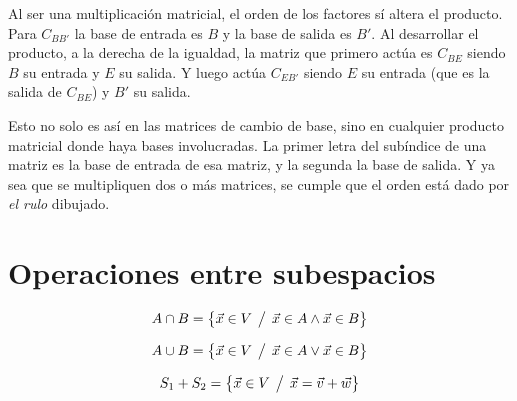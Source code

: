 Al ser una multiplicación matricial, el orden de los factores sí altera el producto.
Para $C_{BB'}$ la base de entrada es $B$ y la base de salida es $B'$.
Al desarrollar el producto, a la derecha de la igualdad, la matriz que primero actúa es $C_{BE}$ siendo $B$ su entrada y $E$ su salida.
Y luego actúa $C_{EB'}$ siendo $E$ su entrada (que es la salida de $C_{BE}$) y $B'$ su salida.

\begin{center}
    \def\svgwidth{0.4\linewidth}
    
\end{center}

Esto no solo es así en las matrices de cambio de base, sino en cualquier producto matricial donde haya bases involucradas.
La primer letra del subíndice de una matriz es la base de entrada de esa matriz, y la segunda la base de salida.
Y ya sea que se multipliquen dos o más matrices, se cumple que el orden está dado por \emph{el rulo} dibujado.


\section{Operaciones entre subespacios}

\begin{mdframed}[style=DefinitionFrame]
    \begin{defn}
    \end{defn}
    \begin{equation*}
        A \cap B = { \left\{ {\Vec{x} \in V \hspace{1ex} \big/ \hspace{1ex} \Vec{x}\in A \land \Vec{x}\in B} \right\} }
    \end{equation*}
\end{mdframed}

\begin{mdframed}[style=DefinitionFrame]
    \begin{defn}
    \end{defn}
    \begin{equation*}
        A \cup B = { \left\{ {\Vec{x} \in V \hspace{1ex} \big/ \hspace{1ex} \Vec{x}\in A \lor \Vec{x}\in B} \right\} }
    \end{equation*}
\end{mdframed}

\begin{mdframed}[style=DefinitionFrame]
    \begin{defn}
    \end{defn}
    \begin{equation*}
        S_1 + S_2 = { \left\{ {\Vec{x} \in V \hspace{1ex} \big/ \hspace{1ex} \Vec{x}=\Vec{v}+\Vec{w}} \right\} }
    \end{equation*}
\end{mdframed}

